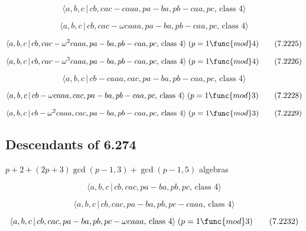 \documentclass[10pt]{article}
\begin{document}
\begin{equation}
\langle a,b,c\,|\,cb,cac-caaa,pa-ba,pb-caa,pc,\,\text{class }4\rangle 
\tag{7.2223}
\end{equation}

\begin{equation}
\langle a,b,c\,|\,cb,cac-\omega caaa,pa-ba,pb-caa,pc,\,\text{class }4\rangle
\tag{7.2224}
\end{equation}

\begin{equation}
\langle a,b,c\,|\,cb,cac-\omega ^{2}caaa,pa-ba,pb-caa,pc,\,\text{class }%
4\rangle \;(p=1\func{mod}4)  \tag{7.2225}
\end{equation}

\begin{equation}
\langle a,b,c\,|\,cb,cac-\omega ^{3}caaa,pa-ba,pb-caa,pc,\,\text{class }%
4\rangle \;(p=1\func{mod}4)  \tag{7.2226}
\end{equation}

\begin{equation}
\langle a,b,c\,|\,cb-caaa,cac,pa-ba,pb-caa,pc,\,\text{class }4\rangle 
\tag{7.2227}
\end{equation}

\begin{equation}
\langle a,b,c\,|\,cb-\omega caaa,cac,pa-ba,pb-caa,pc,\,\text{class }4\rangle
\;(p=1\func{mod}3)  \tag{7.2228}
\end{equation}

\begin{equation}
\langle a,b,c\,|\,cb-\omega ^{2}caaa,cac,pa-ba,pb-caa,pc,\,\text{class }%
4\rangle \;(p=1\func{mod}3)  \tag{7.2229}
\end{equation}

\subsection{Descendants of 6.274}

$p+2+(2p+3)\gcd (p-1,3)+\gcd (p-1,5)$ algebras

\begin{equation}
\langle a,b,c\,|\,cb,cac,pa-ba,pb,pc,\,\text{class }4\rangle  \tag{7.2230}
\end{equation}

\begin{equation}
\langle a,b,c\,|\,cb,cac,pa-ba,pb,pc-caaa,\,\text{class }4\rangle 
\tag{7.2231}
\end{equation}

\begin{equation}
\langle a,b,c\,|\,cb,cac,pa-ba,pb,pc-\omega caaa,\,\text{class }4\rangle
\;(p=1\func{mod}3)  \tag{7.2232}
\end{equation}
\end{document}
